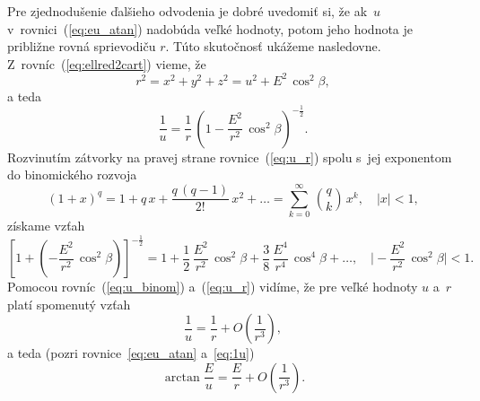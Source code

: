 \documentclass[a4paper,12pt]{book}
\begin{document}
Pre zjednodušenie ďalšieho odvodenia je dobré uvedomiť si, že ak~$u$ 
v~rovnici~(\ref{eq:eu_atan}) nadobúda veľké hodnoty, potom jeho hodnota je 
približne rovná sprievodiču $r$.  Túto skutočnosť ukážeme nasledovne.  
Z~rovníc~(\ref{eq:ellred2cart}) vieme, že
%
\begin{equation}
r^2 = x^2 + y^2 + z^2 = u^2 + E^2 \, \cos^2\beta{,}
\end{equation}
%
a teda
%
\begin{equation}
\label{eq:u_r}
\frac{1}{u} = \frac{1}{r} \, \left( 1 - \frac{E^2}{r^2} \, \cos^2\beta 
\right)^{-\frac{1}{2}}{.}
\end{equation}
%
Rozvinutím zátvorky na pravej strane rovnice~(\ref{eq:u_r}) spolu s~jej 
exponentom do binomického rozvoja \parencite[pozri napríklad][]{Gradshteyn2007}
%
\begin{equation}
(1 + x)^q = 1 + q \, x + \frac{q \, (q - 1)}{2!} \, x^2 + \dots = \sum_{k 
= 0}^{\infty} \, \binom{q}{k} \, x^k{,} \quad | x | < 1{,}
\end{equation}
%
získame vzťah
%
\begin{equation}
\label{eq:u_binom}
\left[ 1 + \left( - \frac{E^2}{r^2} \, \cos^2\beta \right) 
\right]^{-\frac{1}{2}} = 1 + \frac{1}{2} \, \frac{E^2}{r^2} \, \cos^2\beta 
+ \frac{3}{8} \, \frac{E^4}{r^4} \, \cos^4\beta + \dots{,} \quad \bigg\lvert 
-\frac{E^2}{r^2} \, \cos^2\beta \bigg\rvert < 1{.}
\end{equation}
%
Pomocou rovníc~(\ref{eq:u_binom}) a~(\ref{eq:u_r}) vidíme, že pre veľké hodnoty 
$u$ a~$r$ platí spomenutý vzťah
%
\begin{equation}
\label{eq:1u}
\frac{1}{u} = \frac{1}{r} + O\left( \frac{1}{r^3} \right){,}
\end{equation}
%
a teda (pozri rovnice~\ref{eq:eu_atan} a~\ref{eq:1u})
%
\begin{equation}
\label{eq:arctan_eu_r}
\arctan\frac{E}{u} = \frac{E}{r} + O\left( \frac{1}{r^3} \right){.}
\end{equation}
\end{document}
